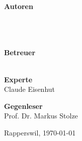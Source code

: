 \begin{titlepage}
\begin{center}
		\vfill
	\end{center}
	
		
	\begin{flushleft}
		\textbf{\Large Autoren}\\
		\Large \rlif \\
		\Large \chuf \\
		\Large \fscf \\
		\vspace{0.5cm}
		
		\textbf{\Large Betreuer}\\
		\Large \proff\\
		\vspace{0.3cm}
		
		\textbf{\Large Experte}\\
		\Large Claude Eisenhut
		\vspace{0.3cm}

		\textbf{\Large Gegenleser}\\
		\Large Prof. Dr. Markus Stolze
		\vspace{0.3cm}
		
		\vspace{1.5cm}
		 Rapperswil, \today
	\end{flushleft}

\end{titlepage}

\restoregeometry
